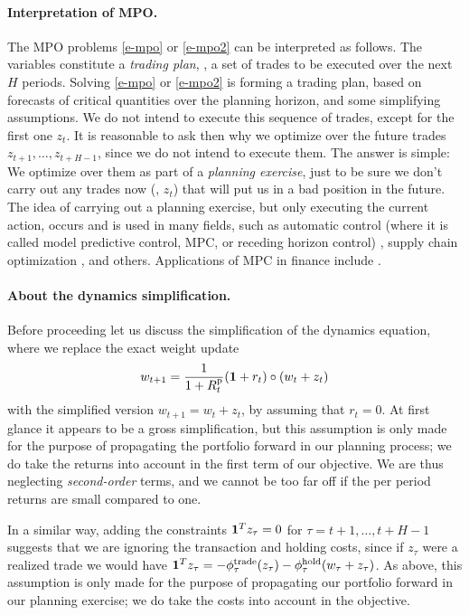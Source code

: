 \documentclass[openany]{article}  %
\newcommand{\trcost}{\phi^\mathrm{trade}}
\newcommand{\hldcost}{\phi^\mathrm{hold}}
\newcommand{\Rp}{R^\mathrm{p}}
\begin{document}
\paragraph{Interpretation of MPO.}
The MPO problems \eqref{e-mpo} or \eqref{e-mpo2} can be interpreted as follows.
The variables constitute a \emph{trading plan}, \ie, a set of trades to be executed
over the next $H$ periods.   Solving \eqref{e-mpo} or \eqref{e-mpo2}
is forming a trading plan, based on forecasts of critical quantities
over the planning horizon, and some simplifying assumptions.
We do not intend to execute this sequence of trades,
except for the first one $z_t$.
It is reasonable to ask then why we optimize over the future trades
$z_{t+1}, \ldots, z_{t+H-1}$, since we do not intend to execute them.
The answer is simple:  We optimize over them as part of a \emph{planning
exercise}, just to be sure we don't carry out any trades now (\ie, $z_t$)
that will put us in a bad position in the future.
The idea of carrying out a planning exercise, but only executing the current action,
occurs and is used in many fields, such as automatic control
(where it is called model predictive control, MPC, or receding horizon control)
\cite{kwon2006receding, mattingley2011receding},
supply chain optimization \cite{cho2003supply}, and others.
Applications of MPC in finance
include \cite{herzog2007stochastic, boyd2014performance,
bemporad2014dynamic,busseti2015volume, nystrup2016dynamic}.

\paragraph{About the dynamics simplification.}
Before proceeding let us discuss the simplification of the dynamics equation,
where we replace the exact weight update
\[
w_{t+1} = \frac{1}{1+\Rp_t} (\ones + r_t) \circ (w_t+z_t)
\]
with the simplified version $w_{t+1} = w_t+z_t$, by assuming that $r_t = 0$.
At first glance it appears to be a gross simplification,
but this assumption is only made for the purpose of propagating the portfolio
forward in our planning process;
we do take the returns into account in the first term of our objective.
We are thus neglecting \emph{second-order} terms, and
we cannot be too far off if the per period returns are small compared to one.

In a similar way, adding the constraints $\mathbf 1^Tz_\tau=0$ for
$\tau = t+1, \ldots, t+H-1$  suggests that we are ignoring the
transaction and holding costs,
since if $z_\tau$ were a realized trade we would have
$\ones^Tz_\tau = -\trcost_\tau(z_\tau) - \hldcost_\tau(w_\tau + z_\tau)$.
As above, this assumption is only
made for the purpose of propagating our portfolio forward in
our planning exercise; we do take the costs into account in the objective.
\end{document}
